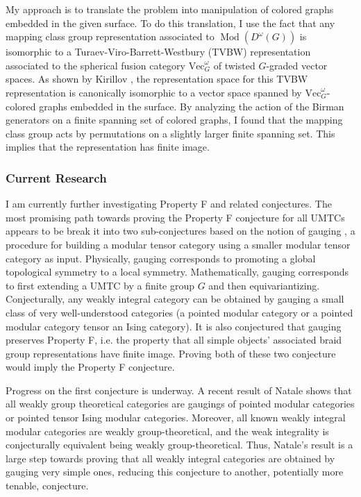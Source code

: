 \documentclass[12pt]{article}
\DeclareMathOperator{\Mod}{Mod}
\theoremstyle{plain} \numberwithin{equation}{section}
\theoremstyle{definition}
\begin{document}
My approach is to translate the problem into manipulation of colored graphs embedded in the given surface. To do this translation, I use the fact that any mapping class group representation associated to $\Mod(D^\omega(G))$ is isomorphic to a Turaev-Viro-Barrett-Westbury (TVBW) representation \cite{bw} associated to the spherical fusion category $\text{Vec}_G^\omega$ of twisted $G$-graded vector spaces. As shown by Kirillov \cite{k} , the representation space for this TVBW representation is canonically isomorphic to a vector space spanned by $\text{Vec}_G^\omega$-colored graphs embedded in the surface. By analyzing the action of the Birman generators \cite{birman} on a finite spanning set of colored graphs, I found that the mapping class group acts by permutations on a slightly larger finite spanning set. This implies that the representation has finite image.

\subsubsection*{Current Research}

I am currently further investigating Property F and related conjectures.  The most promising path towards proving the Property F conjecture for all UMTCs appears to be break it into two sub-conjectures based on the notion of gauging \cite{bbcw}, a procedure for building a modular tensor category using  a smaller modular tensor category as input.   Physically, gauging corresponds to promoting a global topological symmetry to a local symmetry.  Mathematically, gauging corresponds to first extending a UMTC by a finite group $G$ and then equivariantizing. Conjecturally, any weakly integral category can be obtained by gauging a small class of very well-understood categories (a pointed modular category or a pointed modular category tensor an Ising category).   It is also conjectured that gauging  preserves Property F, i.e. the property that all simple objects’ associated braid group representations have finite image.  Proving both of these two conjecture would imply the Property F conjecture.

Progress on the first conjecture is underway. A recent result of Natale \cite{n} shows that all weakly group theoretical categories are gaugings of pointed modular categories or pointed tensor Ising modular categories.  Moreover, all known weakly integral modular categories are weakly group-theoretical, and the weak integrality is conjecturally equivalent being weakly group-theoretical.  Thus, Natale's result is a large step towards proving that all weakly integral categories are obtained by gauging very simple ones, reducing this conjecture to another, potentially more tenable, conjecture.
\end{document}
